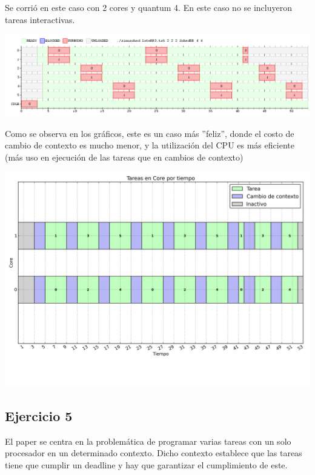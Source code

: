 Se corrió en este caso con 2 cores y quantum 4. En este caso no se incluyeron tareas interactivas.

\begin{center}
\includegraphics[scale=0.4]{graficos/rr_loteRR3.png}
\end{center}

Como se observa en los gráficos, este es un caso más ''feliz'', donde el costo de cambio de contexto es mucho menor, y la utilización del CPU es más eficiente (más uso en ejecución de las tareas que en cambios de contexto)

\begin{center}
\includegraphics[scale=0.4]{graficos/out_cores_timeline1.png}
\end{center}


\subsection{Ejercicio 5}

El paper\cite{liu1973scheduling} se centra en la problemática de programar varias tareas con un solo procesador en un determinado contexto.
Dicho contexto establece que las tareas tiene que cumplir un deadline y hay que garantizar el cumplimiento de este. \\


